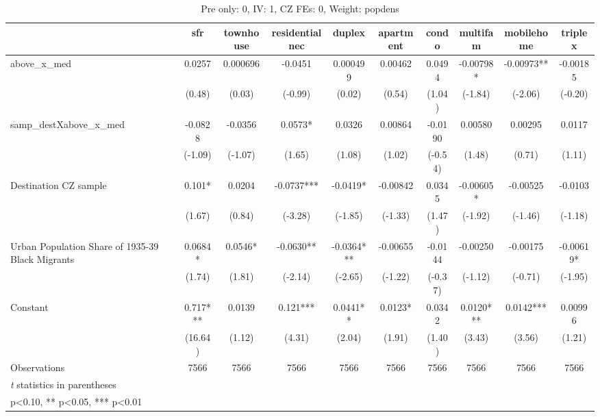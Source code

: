\begin{table}[htbp]\centering
\def\sym#1{\ifmmode^{#1}\else\(^{#1}\)\fi}
\caption{Pre only: 0, IV: 1, CZ FEs: 0, Weight: popdens}
\begin{tabular}{l*{9}{c}}
\toprule
                    &\multicolumn{1}{c}{sfr}&\multicolumn{1}{c}{townhouse}&\multicolumn{1}{c}{residentialnec}&\multicolumn{1}{c}{duplex}&\multicolumn{1}{c}{apartment}&\multicolumn{1}{c}{condo}&\multicolumn{1}{c}{multifam}&\multicolumn{1}{c}{mobilehome}&\multicolumn{1}{c}{triplex}\\
\midrule
above\_x\_med         &      0.0257   &    0.000696   &     -0.0451   &    0.000499   &     0.00462   &      0.0494   &    -0.00798*  &    -0.00973** &    -0.00185   \\
                    &      (0.48)   &      (0.03)   &     (-0.99)   &      (0.02)   &      (0.54)   &      (1.04)   &     (-1.84)   &     (-2.06)   &     (-0.20)   \\
\addlinespace
samp\_destXabove\_x\_med&     -0.0828   &     -0.0356   &      0.0573*  &      0.0326   &     0.00864   &     -0.0190   &     0.00580   &     0.00295   &      0.0117   \\
                    &     (-1.09)   &     (-1.07)   &      (1.65)   &      (1.08)   &      (1.02)   &     (-0.54)   &      (1.48)   &      (0.71)   &      (1.11)   \\
\addlinespace
Destination CZ sample&       0.101*  &      0.0204   &     -0.0737***&     -0.0419*  &    -0.00842   &      0.0345   &    -0.00605*  &    -0.00525   &     -0.0103   \\
                    &      (1.67)   &      (0.84)   &     (-3.28)   &     (-1.85)   &     (-1.33)   &      (1.47)   &     (-1.92)   &     (-1.46)   &     (-1.18)   \\
\addlinespace
Urban Population Share of 1935-39 Black Migrants&      0.0684*  &      0.0546*  &     -0.0630** &     -0.0364***&    -0.00655   &     -0.0144   &    -0.00250   &    -0.00175   &    -0.00619*  \\
                    &      (1.74)   &      (1.81)   &     (-2.14)   &     (-2.65)   &     (-1.22)   &     (-0.37)   &     (-1.12)   &     (-0.71)   &     (-1.95)   \\
\addlinespace
Constant            &       0.717***&      0.0139   &       0.121***&      0.0441** &      0.0123*  &      0.0342   &      0.0120***&      0.0142***&     0.00996   \\
                    &     (16.64)   &      (1.12)   &      (4.31)   &      (2.04)   &      (1.91)   &      (1.40)   &      (3.43)   &      (3.56)   &      (1.21)   \\
\midrule
Observations        &        7566   &        7566   &        7566   &        7566   &        7566   &        7566   &        7566   &        7566   &        7566   \\
\bottomrule
\multicolumn{10}{l}{\footnotesize \textit{t} statistics in parentheses}\\
\multicolumn{10}{l}{\footnotesize * p<0.10, ** p<0.05, *** p<0.01}\\
\end{tabular}
\end{table}
